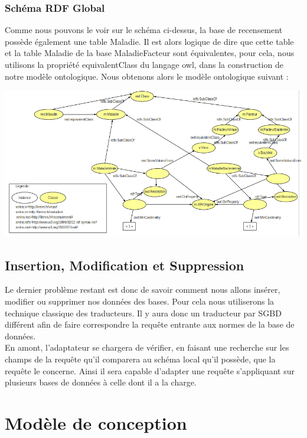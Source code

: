 \documentclass[12pt]{article}
\begin{document}
\subsubsection{Schéma RDF Global}

Comme nous pouvons le voir sur le schéma ci-dessus, la base de recensement possède également une table Maladie. Il est alors logique de dire que cette table et la table Maladie de la base MaladieFacteur sont équivalentes, pour cela, nous utilisons la propriété equivalentClass du langage owl, dans la construction de notre modèle ontologique. Nous obtenons alors le modèle ontologique suivant :

\begin{center}
	\includegraphics[scale=0.50]{images/rdf-global.png}
\end{center}

\subsection{Insertion, Modification et Suppression}
	
	Le dernier problème restant est donc de savoir comment nous allons insérer, modifier ou supprimer nos données des bases. Pour cela nous utiliserons la technique classique des traducteurs. Il y aura donc un traducteur par SGBD différent afin de faire correspondre la requête entrante aux normes de la base de données. \\
En amont, l'adaptateur se chargera de vérifier, en faisant une recherche sur les champs de la requête qu'il comparera au schéma local qu'il possède, que la requête le concerne. Ainsi il sera capable d'adapter une requête s'appliquant sur plusieurs bases de données à celle dont il a la charge.

\newpage

\section{Modèle de conception}
\end{document}
